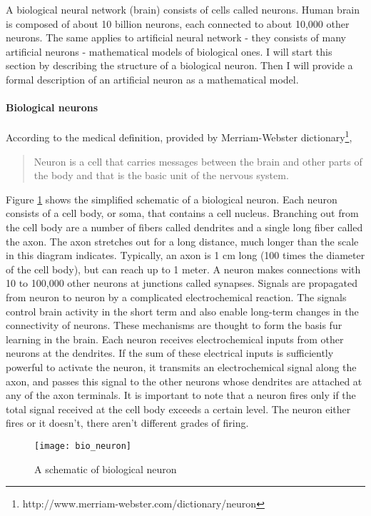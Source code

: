 A biological neural network (brain) consists of cells called neurons. Human brain is composed of about 10 billion neurons, each connected to about 10,000 other neurons. The same applies to artificial neural network - they consists of many artificial neurons - mathematical models of biological ones. I will start this section by describing the structure of a biological neuron. Then I will provide a formal description of an artificial neuron as a mathematical model.

\paragraph{Biological neurons} According to the medical definition, provided by Merriam-Webster dictionary\footnote{http://www.merriam-webster.com/dictionary/neuron},
\begin{quote}
  Neuron is a cell that carries messages between the brain and other parts of the body and that is the basic unit of the nervous system.
\end{quote}

Figure \ref{fig:bioneuron} shows the simplified schematic of a biological neuron. Each neuron consists of a cell body, or soma, that contains a cell nucleus. Branching out from the cell body are a number of fibers called dendrites and a single long fiber called the axon. The axon stretches out for a long distance, much longer than the scale in this diagram indicates. Typically, an axon is 1 cm long (100 times the diameter of the cell body), but can reach up to 1 meter. A neuron makes connections with 10 to 100,000 other neurons at junctions called synapses. Signals are propagated from neuron to neuron by a complicated electrochemical reaction. The signals control brain activity in the short term and also enable long-term changes in the connectivity of neurons. These mechanisms are thought to form the basis fur learning in the brain.
Each neuron receives electrochemical inputs from other neurons at the dendrites.  If the sum of these electrical inputs is sufficiently powerful to activate the neuron, it transmits an electrochemical signal along the axon, and passes this signal to the other neurons whose dendrites are attached at any of the axon terminals.
It is important to note that a neuron fires only if the total signal received at the cell body exceeds a certain level.  The neuron either fires or it doesn't, there aren't different grades of firing. 

\begin{figure}[H]
  \centering
  \texttt{[image: bio\_neuron]}
  \caption{A schematic of biological neuron}
  \label{fig:bioneuron}
\end{figure}


